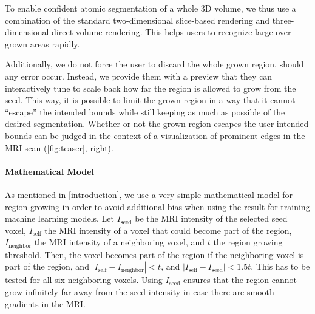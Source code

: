 \documentclass[sigconf]{acmart}
\begin{document}
To enable confident atomic segmentation of a whole 3D volume, we thus use a combination of the standard two-dimensional slice-based rendering and three-dimensional direct volume rendering. This helps users to recognize large over-grown areas rapidly.

Additionally, we do not force the user to discard the whole grown region, should any error occur. Instead, we provide them with a preview that they can interactively tune to scale back how far the region is allowed to grow from the seed. This way, it is possible to limit the grown region in a way that it cannot \enquote{escape} the intended bounds while still keeping as much as possible of the desired segmentation. Whether or not the grown region escapes the user-intended bounds can be judged in the context of a visualization of prominent edges in the MRI scan (\cref{fig:teaser}, right).

\paragraph{Mathematical Model}
As mentioned in \cref{introduction}, we use a very simple mathematical model for region growing in order to avoid additional bias when using the result for training machine learning models.
Let $I_\textrm{seed}$ be the MRI intensity of the selected seed voxel, $I_\textrm{self}$ the MRI intensity of a voxel that could become part of the region, $I_\textrm{neighbor}$ the MRI intensity of a neighboring voxel, and $t$ the region growing threshold.
Then, the voxel becomes part of the region if the neighboring voxel is part of the region, and $|I_\textrm{self} - I_\textrm{neighbor}| < t$, and $|I_\textrm{self} - I_\textrm{seed}| < 1.5 t$.
This has to be tested for all six neighboring voxels.
Using $I_\textrm{seed}$ ensures that the region cannot grow infinitely far away from the seed intensity in case there are smooth gradients in the MRI.
\end{document}
